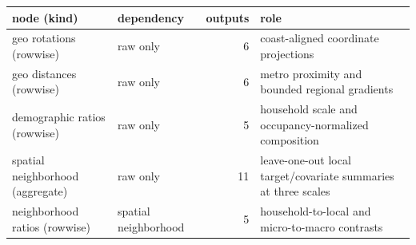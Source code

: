 \begin{tabular}{p{3.8cm}p{3.0cm}rp{6.0cm}}
\toprule
node (kind) & dependency & outputs & role \\
\midrule
geo rotations (rowwise) & raw only & 6 & coast-aligned coordinate projections \\
geo distances (rowwise) & raw only & 6 & metro proximity and bounded regional gradients \\
demographic ratios (rowwise) & raw only & 5 & household scale and occupancy-normalized composition \\
spatial neighborhood (aggregate) & raw only & 11 & leave-one-out local target/covariate summaries at three scales \\
neighborhood ratios (rowwise) & spatial neighborhood & 5 & household-to-local and micro-to-macro contrasts \\
\bottomrule
\end{tabular}
